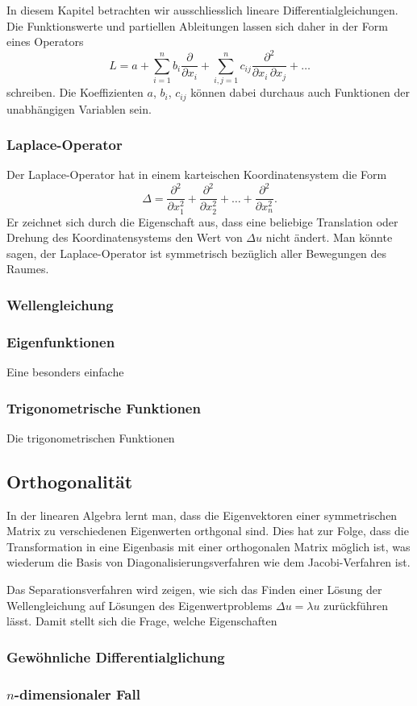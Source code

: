 In diesem Kapitel betrachten wir ausschliesslich lineare
Differentialgleichungen.
Die Funktionswerte und partiellen Ableitungen lassen sich daher
in der Form eines Operators
\[
L 
=
a
+ \sum_{i=1}^n b_i \frac{\partial}{\partial x_i}
+ \sum_{i,j=1}^n c_{ij} \frac{\partial^2}{\partial x_i\,\partial x_j}
+ \dots
\]
schreiben.
Die Koeffizienten $a$, $b_i$, $c_{ij}$ können dabei durchaus auch
Funktionen der unabhängigen Variablen sein.

\subsubsection{Laplace-Operator}
Der Laplace-Operator hat in einem karteischen Koordinatensystem die
Form
\[
\Delta
=
\frac{\partial^2}{\partial x_1^2}
+
\frac{\partial^2}{\partial x_2^2}
+
\dots
+
\frac{\partial^2}{\partial x_n^2}.
\]
Er zeichnet sich durch die Eigenschaft aus, dass eine beliebige 
Translation oder Drehung des Koordinatensystems den Wert von $\Delta u$
nicht ändert.
Man könnte sagen, der Laplace-Operator ist symmetrisch bezüglich
aller Bewegungen des Raumes.

\subsubsection{Wellengleichung}

\subsubsection{Eigenfunktionen}
Eine besonders einfache 

\subsubsection{Trigonometrische Funktionen}
Die trigonometrischen Funktionen 

\subsection{Orthogonalität}
In der linearen Algebra lernt man, dass die Eigenvektoren einer
symmetrischen Matrix zu verschiedenen Eigenwerten orthgonal sind.
Dies hat zur Folge, dass die Transformation in eine Eigenbasis
mit einer orthogonalen Matrix möglich ist, was wiederum die Basis
von Diagonalisierungsverfahren wie dem Jacobi-Verfahren ist.

Das Separationsverfahren wird zeigen, wie sich das Finden einer
Lösung der Wellengleichung auf Lösungen des Eigenwertproblems
$\Delta u = \lambda u$ zurückführen lässt.
Damit stellt sich die Frage, welche Eigenschaften 


\subsubsection{Gewöhnliche Differentialglichung}


\subsubsection{$n$-dimensionaler Fall}
